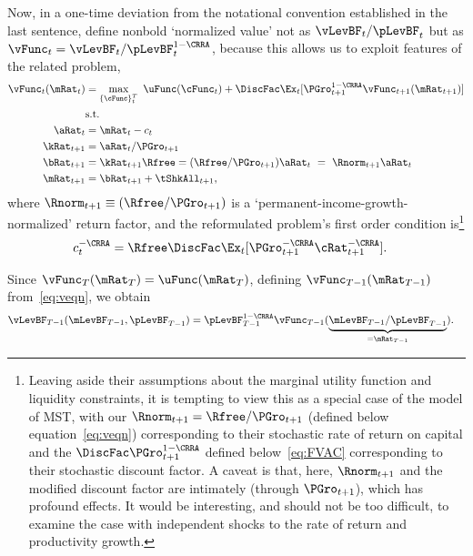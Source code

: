 \documentclass[BufferStockTheory]{subfiles}
\begin{document}
Now, in a one-time deviation from the notational convention established in the last sentence, define nonbold `normalized value' not as $\vLevBF_{t}/\pLevBF_{t}$ but as $\vFunc_{t} = \vLevBF_{t}/\pLevBF_{t}^{1-\CRRA}$, because this allows us to exploit features of the related problem,
\begin{align}
  \vFunc_{t}(\mRat_{t})  & = \max_{{\{\cFunc\}}_{t}^{T}}~  \uFunc(\cFunc_{t}) +\DiscFac \Ex_{t}[\PGro_{t+1}^{1-\CRRA}\vFunc_{t+1}({\mRat}_{t+1})] \notag \\
                         & \mbox{s.t.}  \label{eq:veqn}
  \\ {\aRat}_{t}  & = \mRat_{t}-c_{t}  \notag
  \\ {\kRat}_{t+1} & = \aRat_{t}/\PGro_{t+1}  \notag
  \\ {\bRat}_{t+1}  & = {\kRat}_{t+1}\Rfree = (\Rfree/\PGro_{t+1})\aRat_{t}  ~ = ~ \Rnorm_{t+1}\aRat_{t}  \notag
  \\ \mRat_{t+1}  & = \bRat_{t+1}+\tShkAll_{t+1}  \notag, %
\end{align}
where $\Rnorm_{t+1}\equiv (\Rfree/\PGro_{t+1})$ is a `permanent-income-growth-normalized' return factor, and the reformulated problem's first order condition is\footnote{Leaving aside their assumptions about the marginal utility function and liquidity constraints, it is tempting to view this as a special case of the model of MST, with our $\Rnorm_{t+1}=\Rfree/\PGro_{t+1}$ (defined below equation~\eqref{eq:veqn}) corresponding to their stochastic rate of return on capital and the {\FVAF} $\DiscFac \PGro_{t+1}^{1-\CRRA}$ defined below~\eqref{eq:FVAC} corresponding to their stochastic discount factor.  A caveat is that, here, $\Rnorm_{t+1}$ and the modified discount factor are intimately (through $\PGro_{t+1}$), which has profound effects.  It would be interesting, and should not be too difficult, to examine the case with independent shocks to the rate of return and productivity growth.}
\begin{align}
  c_{t}^{-\CRRA}  & = \Rfree \DiscFac \Ex_{t}[ {\PGro}_{t+1}^{-\CRRA} {\cRat}
                    _{t+1}^{-\CRRA}].  \label{eq:scaledeuler}
\end{align}

Since $\vFunc_{T}(\mRat_{T}) = \uFunc(\mRat_{T})$, defining $\vFunc_{T-1}(\mRat_{T-1})$ from~\eqref{eq:veqn}, we obtain
\begin{align*}
  \vLevBF_{T-1}(\mLevBF_{T-1},\pLevBF_{T-1})  & = \pLevBF_{T-1}^{1-\CRRA} \vFunc_{T-1}(\underbrace{\mLevBF_{T-1}/\pLevBF_{T-1}}_{=\mRat_{T-1}}).
\end{align*}
\end{document}
